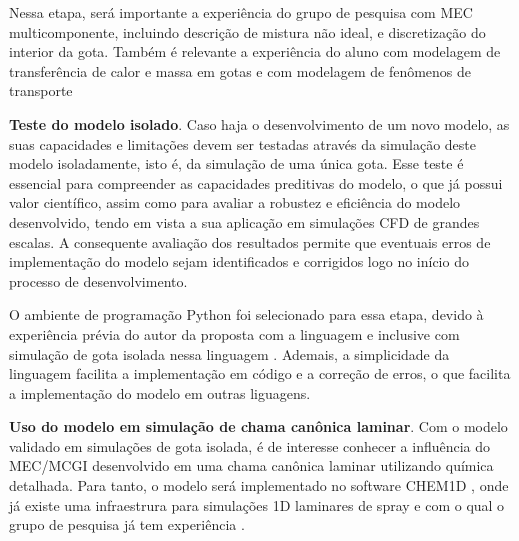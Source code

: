 Nessa etapa, será importante a experiência do grupo de pesquisa com MEC multicomponente, incluindo descrição de mistura não ideal, e discretização do interior da gota.
Também é relevante a experiência do aluno com modelagem de transferência de calor e massa em gotas \cite{HenningsJ2024MT} e com modelagem de fenômenos de transporte \cite{HenningsJ2023BT}  %

\textbf{Teste do modelo isolado}.
Caso haja o desenvolvimento de um novo modelo, as suas capacidades e limitações devem ser testadas através da simulação deste modelo isoladamente, isto é, da simulação de uma única gota.
Esse teste é essencial para compreender as capacidades preditivas do modelo, o que já possui valor científico, assim como para avaliar a robustez e eficiência do modelo desenvolvido, tendo em vista a sua aplicação em simulações CFD de grandes escalas.
A consequente avaliação dos resultados permite que eventuais erros de implementação do modelo sejam identificados e corrigidos logo no início do processo de desenvolvimento.

O ambiente de programação Python foi selecionado para essa etapa, devido à experiência prévia do autor da proposta com a linguagem e inclusive com simulação de gota isolada nessa linguagem \cite{HenningsJ2024MT}.
Ademais, a simplicidade da linguagem facilita a implementação em código e a correção de erros, o que facilita a implementação do modelo em outras liguagens.

\textbf{Uso do modelo em simulação de chama canônica laminar}.
Com o modelo validado em simulações de gota isolada, é de interesse conhecer a influência do MEC/MCGI desenvolvido em uma chama canônica laminar utilizando química detalhada.
Para tanto, o modelo será implementado no software CHEM1D \cite{Sommers1994PhD}, onde já existe uma infraestrura para simulações 1D laminares de spray \cite{Sommers1994PhD,vanOijen2002CTM,vanOijen2016PECS, SacomanoF2018CTM,SacomanoF2021Fluids} e com o qual o grupo de pesquisa já tem experiência \cite{SacomanoF2018CTM,SacomanoF2019IJHMT,SacomanoF2021Fluids,SacomanoF2024CF,SacomanoF2025CF}.

